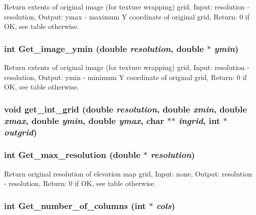 Return extents of original image (for texture wrapping) grid, Input: resolution - resolution, Output: ymax - maximum Y coordinate of original grid, Return: 0 if OK, see table otherwise. 

\hypertarget{GisApi_8C_a42}{
\subsubsection[Get\_\-image\_\-ymin]{\setlength{\rightskip}{0pt plus 5cm}int Get\_\-image\_\-ymin (double {\em resolution}, double $\ast$ {\em ymin})}}
\label{GisApi_8C_a42}


Return extents of original image (for texture wrapping) grid, Input: resolution - resolution, Output: ymin - minimum Y coordinate of original grid, Return: 0 if OK, see table otherwise. 

\hypertarget{GisApi_8C_a17}{
\subsubsection[get\_\-int\_\-grid]{\setlength{\rightskip}{0pt plus 5cm}void get\_\-int\_\-grid (double {\em resolution}, double {\em xmin}, double {\em xmax}, double {\em ymin}, double {\em ymax}, char $\ast$$\ast$ {\em ingrid}, int $\ast$ {\em outgrid})}}
\label{GisApi_8C_a17}


\hypertarget{GisApi_8C_a64}{
\subsubsection[Get\_\-max\_\-resolution]{\setlength{\rightskip}{0pt plus 5cm}int Get\_\-max\_\-resolution (double $\ast$ {\em resolution})}}
\label{GisApi_8C_a64}


Return original resolution of elevation map grid, Input: none, Output: resolution - resolution, Return: 0 if OK, see table otherwise. 

\hypertarget{GisApi_8C_a66}{
\subsubsection[Get\_\-number\_\-of\_\-columns]{\setlength{\rightskip}{0pt plus 5cm}int Get\_\-number\_\-of\_\-columns (int $\ast$ {\em cols})}}
\label{GisApi_8C_a66}


